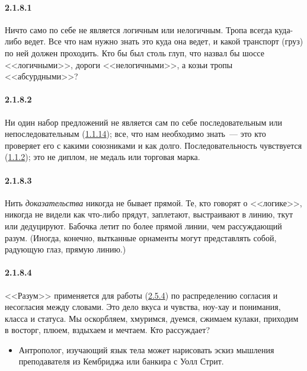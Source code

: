 \paragraph{2.1.8.1}\hypertarget{par:2.1.8.1}{} Ничто само по себе не является логичным или нелогичным. Тропа всегда куда-либо ведет. Все что нам нужно знать это куда она ведет, и какой транспорт (груз) по ней должен проходить. Кто бы был столь глуп, что назвал бы шоссе <<логичными>>, дороги <<нелогичными>>, а козьи тропы <<абсурдными>>?

\paragraph{2.1.8.2}\hypertarget{par:2.1.8.2}{} Ни один набор предложений не является сам по себе последовательным или непоследовательным (\hyperlink{par:1.1.14}{1.1.14}); все, что нам необходимо знать~--- это кто проверяет его с какими союзниками и как долго. Последовательность чувствуется (\hyperlink{par:1.1.2}{1.1.2}); это не диплом, не медаль или торговая марка.

\paragraph{2.1.8.3}\hypertarget{par:2.1.8.3}{} Нить {\itshape доказательства} никогда не бывает прямой. Те, кто говорят о <<логике>>, никогда не видели как что-либо прядут, заплетают, выстраивают в линию, ткут или дедуцируют. Бабочка летит по более прямой линии, чем рассуждающий разум. (Иногда, конечно, вытканные орнаменты могут представлять собой, радующую глаз, прямую
линию.)

\paragraph{2.1.8.4}\hypertarget{par:2.1.8.4}{} <<Разум>> применяется для работы (\hyperlink{par:2.5.4}{2.5.4}) по распределению согласия и несогласия между словами. Это дело вкуса и чувства, ноу-хау и понимания, класса и статуса. Мы оскорбляем, хмуримся, дуемся, сжимаем кулаки, приходим в восторг, плюем, вздыхаем и мечтаем. Кто рассуждает?
	\begin{itemize}
	\item 
	Антрополог, изучающий язык тела может нарисовать эскиз мышления преподавателя из Кембриджа или банкира с Уолл Стрит.
	\end{itemize}

